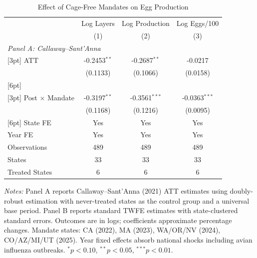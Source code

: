 \begin{table}[htbp]
\centering
\caption{Effect of Cage-Free Mandates on Egg Production}
\label{tab:main}
\begin{tabular}{lccc}
\hline\hline
 & Log Layers & Log Production & Log Eggs/100 \\
 & (1) & (2) & (3) \\
\hline
\multicolumn{4}{l}{\textit{Panel A: Callaway--Sant'Anna}} \\
{}[3pt]
ATT & -0.2453$^{**}$ & -0.2687$^{**}$ & -0.0217 \\
 & (0.1133) & (0.1066) & (0.0158) \\
{}[6pt]
\multicolumn{4}{l}{\textit{Panel B: TWFE}} \\
{}[3pt]
Post $\times$ Mandate & -0.3197$^{**}$ & -0.3561$^{***}$ & -0.0363$^{***}$ \\
 & (0.1168) & (0.1216) & (0.0095) \\
{}[6pt]
\hline
State FE & Yes & Yes & Yes \\
Year FE & Yes & Yes & Yes \\
Observations & 489 & 489 & 489 \\
States & 33 & 33 & 33 \\
Treated States & 6 & 6 & 6 \\
\hline\hline
\end{tabular}
\begin{tablenotes}[flushleft]
\small
\item \textit{Notes:} Panel A reports Callaway--Sant'Anna (2021) ATT estimates using doubly-robust estimation with never-treated states as the control group and a universal base period. Panel B reports standard TWFE estimates with state-clustered standard errors. Outcomes are in logs; coefficients approximate percentage changes. Mandate states: CA (2022), MA (2023), WA/OR/NV (2024), CO/AZ/MI/UT (2025). Year fixed effects absorb national shocks including avian influenza outbreaks. $^{*}p<0.10$, $^{**}p<0.05$, $^{***}p<0.01$.
\end{tablenotes}
\end{table}

